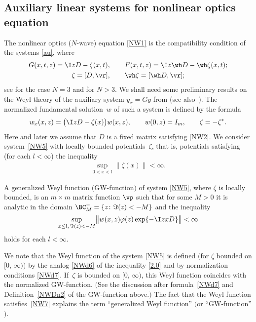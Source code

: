 \subsection{Auxiliary linear systems for nonlinear optics equation}\label{subs2.2}

The nonlinear optics ($N$-wave) equation \eqref{NW1} is the compatibility condition
of the systems \eqref{au}, where
\begin{gather} \label{NW4}
G(x,t,z)=\I z D-\zeta(x,t), \qquad F(x,t,z)=\I z \wh D-\wh \zeta(x,t); \nonumber\\ \zeta=[D, \vr], \qquad \wh \zeta =[\wh D, \vr];
\end{gather}
see \cite{ZaMa} for the case $N=3$ and \cite{AbH} for $N>3$. We shall need
some preliminary results on the Weyl theory of the auxiliary system $y_x=Gy$
from \cite[Chapter~4]{SaSaR} (see also~\cite{SaA17}). The normalized fundamental solution~$w$
of such a system is def\/ined by the formula
\begin{gather} \label{NW5}
w_x(x,z)=\big(\I z D-\zeta(x)\big)w(x,z), \qquad w(0,z)=I_m, \qquad \zeta =- \zeta^* .
\end{gather}
Here and later we assume that $D$ is a f\/ixed matrix satisfying \eqref{NW2}. We consider
system~\eqref{NW5} with locally bounded potentials~$\zeta$, that is, potentials satisfying (for each $l<\infty$)
the inequality
\begin{gather}
  \sup\limits_{0 < x < l}
   \bigl\|
    \zeta (x)
   \bigr\|
  < \infty.
 \label{NW6}
\end{gather}
\begin{Definition} \label{NWDn2}
 A generalized Weyl function $($GW-function$)$ of system
\eqref{NW5}, where $\zeta$ is locally bounded, is an $m \times m$ matrix function $\vp$ such that for some $M>0$ it is analytic in the domain
$\BC^{-}_M = \{ z \colon \Im(z) < - M \}$ and the
inequality
\begin{gather}
  \sup\limits_{x \leq l, \, \Im (z) < -M}
   \bigl\|
    w(x,z)
    \varphi (z)\exp \{-\I z x D\}
   \bigr\|
 < \infty
 \label{NW7}
\end{gather}
holds for each
$l < \infty$.
\end{Definition}

\begin{Remark} We note that the Weyl function of the system \eqref{NW5} is def\/ined $\big($for $\zeta$ bounded on $[0,\, \infty)\big)$
by the analog \eqref{NWd6} of the inequality \eqref{2.0} and by normalization conditions \eqref{NWd7}. If~$\zeta$ is bounded on $[0,\, \infty)$, this Weyl function
coincides with the normalized {\rm GW}-function.
$($See the discussion after formula~\eqref{NWd7} and Def\/inition~\ref{NWDn2} of the {\rm GW}-function above.$)$ The fact that the Weyl function satisf\/ies~\eqref{NW7} explains the term ``generalized Weyl function'' $($or ``{\rm GW}-function''$)$.
\end{Remark}

